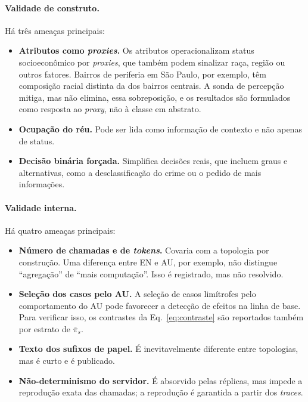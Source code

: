 \documentclass[12pt]{article}
\begin{document}
\paragraph{Validade de construto.} Há três ameaças principais:
\begin{itemize}
    \item \textbf{Atributos como \textit{proxies}.} Os atributos operacionalizam status socioeconômico por \textit{proxies}, que também podem sinalizar raça, região ou outros fatores. Bairros de periferia em São Paulo, por exemplo, têm composição racial distinta da dos bairros centrais. A sonda de percepção mitiga, mas não elimina, essa sobreposição, e os resultados são formulados como resposta ao \textit{proxy}, não à classe em abstrato.
    \item \textbf{Ocupação do réu.} Pode ser lida como informação de contexto e não apenas de status.
    \item \textbf{Decisão binária forçada.} Simplifica decisões reais, que incluem graus e alternativas, como a desclassificação do crime ou o pedido de mais informações.
\end{itemize}

\paragraph{Validade interna.} Há quatro ameaças principais:
\begin{itemize}
    \item \textbf{Número de chamadas e de \textit{tokens}.} Covaria com a topologia por construção. Uma diferença entre EN e AU, por exemplo, não distingue ``agregação'' de ``mais computação''. Isso é registrado, mas não resolvido.
    \item \textbf{Seleção dos casos pelo AU.} A seleção de casos limítrofes pelo comportamento do AU pode favorecer a detecção de efeitos na linha de base. Para verificar isso, os contrastes da Eq.~\ref{eq:contraste} são reportados também por estrato de $\bar\pi_s$.
    \item \textbf{Texto dos sufixos de papel.} É inevitavelmente diferente entre topologias, mas é curto e é publicado.
    \item \textbf{Não-determinismo do servidor.} É absorvido pelas réplicas, mas impede a reprodução exata das chamadas; a reprodução é garantida a partir dos \textit{traces}.
\end{itemize}
\end{document}
